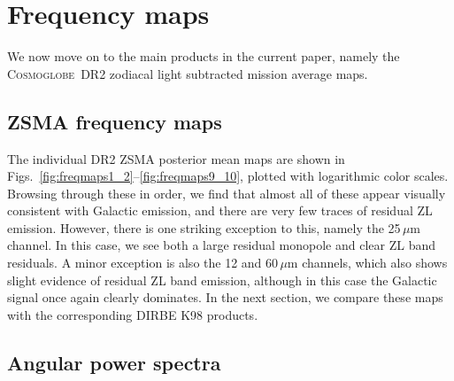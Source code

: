 \documentclass{aa}
\renewcommand{\a}[0]{\vec{a}}
\newcommand{\cosmoglobe}{\textsc{Cosmoglobe}}
\begin{document}

\section{Frequency maps}
\label{sec:maps}

We now move on to the main products in the current paper, namely the
\cosmoglobe\ DR2 zodiacal light subtracted mission average maps.

\subsection{ZSMA frequency maps}

The individual DR2 ZSMA posterior mean maps are shown in
Figs.~\ref{fig:freqmaps1_2}--\ref{fig:freqmaps9_10}, plotted with
logarithmic color scales. Browsing through these in order, we find
that almost all of these appear visually consistent with Galactic
emission, and there are very few traces of residual ZL
emission. However, there is one striking exception to this, namely the
25$\,\mu$m channel. In this case, we see both a large residual
monopole and clear ZL band residuals. A minor exception is also the
12 and 60$\,\mu$m channels, which also shows slight evidence of residual ZL
band emission, although in this case the Galactic signal once again
clearly dominates. In the next section, we compare these maps with the
corresponding DIRBE K98 products.


\subsection{Angular power spectra}
\end{document}
